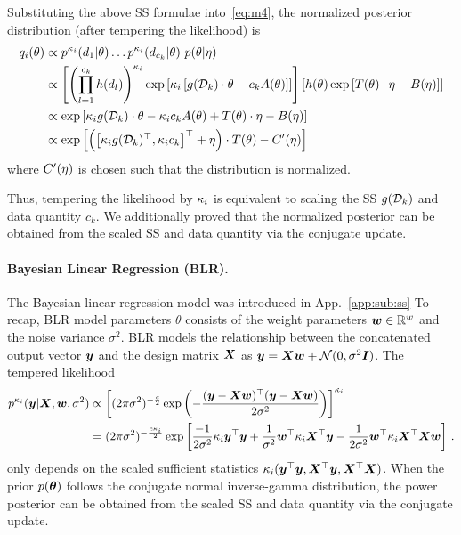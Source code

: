 \documentclass{article}
\theoremstyle{plain}
\theoremstyle{definition}
\theoremstyle{remark}
\begin{document}
Substituting the above SS formulae into~\eqref{eq:m4}, the normalized posterior distribution (after tempering the likelihood) is
\begin{align*}
    q_i(\theta) & \propto p^{{\kappa_i}}(d_1|\theta) \dots p^{{\kappa_i}} (d_{c_k}|\theta)\ p(\theta|\mathbf{\eta}) \\
    & \propto \left[ \left(\prod_{l=1}^{c_k} h(d_l) \right)^{{\kappa_i}} \exp \left[ {\kappa_i} \left[g({\mathcal{D}}_k) \cdot \theta - c_k A(\theta)\right] \right] \right]
    \left[ h(\theta)\exp{[T(\theta) \cdot \mathbf{\eta}- B(\mathbf{\eta})]} \right] \\
    & \propto \exp\left[{\kappa_i} g({\mathcal{D}}_k) \cdot \theta - {\kappa_i} c_k A(\theta) + T(\theta) \cdot \mathbf{\eta} - B(\mathbf{\eta}) \right] \\
    & \propto \exp\left[
    \left(\begin{bmatrix}{\kappa_i} g({\mathcal{D}}_k)^\top, {\kappa_i} c_k \end{bmatrix}^\top + \mathbf{\eta} \right) \cdot T(\theta) - C'(\mathbf{\eta}) \right]
\end{align*}
where $C'(\mathbf{\eta})$ is chosen such that the distribution is normalized.

Thus, tempering the likelihood by ${\kappa_i}$ is equivalent to scaling the SS $g({\mathcal{D}}_k)$ and data quantity $c_k$.
We additionally proved that the normalized posterior can be obtained from the scaled SS and data quantity via the conjugate update.

\paragraph{Bayesian Linear Regression (BLR).}

The Bayesian linear regression model was introduced in App.~\ref{app:sub:ss}
To recap, BLR model parameters $\theta$ consists of the weight parameters ${\bm{w}} \in \mathbb{R}^w$ and the noise variance $\sigma^2$.
BLR models the relationship between the concatenated output vector ${\bm{y}}$ and the design matrix ${\bm{X}}$ as ${\bm{y}} = {\bm{X}} {\bm{w}} + \mathcal{N}(0, \sigma^2{\bm{I}})$.
The tempered likelihood 
\begin{align*}
 p^{\kappa_i}({\bm{y}} | {\bm{X}}, {\bm{w}}, \sigma^2) & \propto \left[ (2 \pi \sigma^2)^{-\frac{c}{2}} \exp{\left( -\frac{({\bm{y}}-{\bm{X}}{\bm{w}})^\top ({\bm{y}}-{\bm{X}}{\bm{w}})}{2\sigma^2}\right)} \right]^{\kappa_i} \\
&= (2 \pi \sigma^2)^{-\frac{c {\kappa_i}}{2}} \exp{\left[\frac{-1}{2\sigma^2} {\kappa_i}{\bm{y}}^\top {\bm{y}}+ \frac{1}{\sigma^2}{\bm{w}}^\top {\kappa_i}{\bm{X}}^\top {\bm{y}}- \frac{1}{2\sigma^2}{\bm{w}}^\top {\kappa_i}{\bm{X}}^\top {\bm{X}}{\bm{w}}\right]}\ . 
\end{align*}
only depends on the scaled sufficient statistics ${\kappa_i} ({\bm{y}}^\top {\bm{y}}, {\bm{X}}^\top {\bm{y}}, {\bm{X}}^\top {\bm{X}})$.
When the prior $p({\bm{\theta}})$ follows the conjugate normal inverse-gamma distribution, the power posterior can be obtained from the scaled SS and data quantity via the conjugate update.
\end{document}
